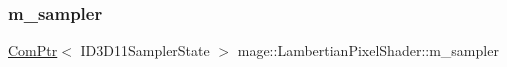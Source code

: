 \hypertarget{classmage_1_1_lambertian_pixel_shader_af90588b8ecf4ba9aa796ee3ed74519b5}{}\label{classmage_1_1_lambertian_pixel_shader_af90588b8ecf4ba9aa796ee3ed74519b5} 
\subsubsection{\texorpdfstring{m\+\_\+sampler}{m\_sampler}}
{\footnotesize\ttfamily \hyperlink{namespacemage_ae74f374780900893caa5555d1031fd79}{Com\+Ptr}$<$ I\+D3\+D11\+Sampler\+State $>$ mage\+::\+Lambertian\+Pixel\+Shader\+::m\+\_\+sampler\hspace{0.3cm}{\ttfamily [private]}}

